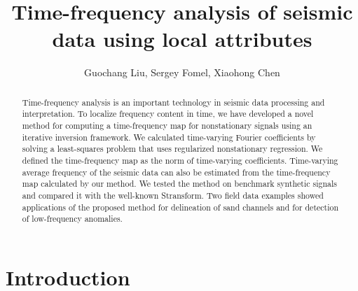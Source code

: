 
\title{Time-frequency analysis of seismic data using local attributes}

\renewcommand{\thefootnote}{\fnsymbol{footnote}}


\address{
\footnotemark[1] State Key Laboratory of Petroleum Resources and Prospecting\\
China University of Petroleum\\
Beijing, China \\
\footnotemark[2] Bureau of Economic Geology,\\
John A. and Katherine G. Jackson School of Geosciences \\
The University of Texas at Austin \\
University Station, Box X \\
Austin, TX, USA, 78713-8924 \\
}

\author{Guochang Liu\footnotemark[1], Sergey Fomel\footnotemark[2], Xiaohong Chen\footnotemark[1]}

\maketitle

\begin{abstract}

Time-frequency analysis is an important technology in 
seismic data processing and interpretation. 
To localize frequency content in time, we have developed a novel method
for computing a time-frequency map for nonstationary signals
using an iterative inversion framework. We calculated
time-varying Fourier coefficients by solving a least-squares
problem that uses regularized nonstationary regression. We
defined the time-frequency map as the norm of time-varying
coefficients. Time-varying average frequency of the seismic
data can also be estimated from the time-frequency map calculated
by our method. We tested the method on benchmark
synthetic signals and compared it with the well-known Stransform.
Two field data examples showed applications
of the proposed method for delineation of sand channels
and for detection of low-frequency anomalies.

\end{abstract}

\section{Introduction}

